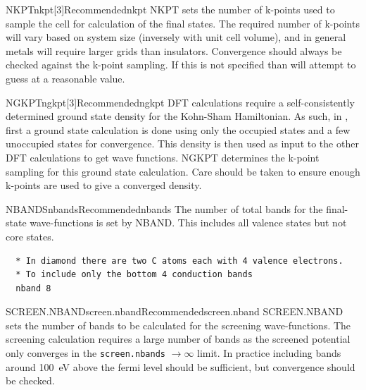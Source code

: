 \documentclass[11pt]{report}
\begin{document}
\begin{Card}{NKPT}{nkpt[3]}{Recommended}{nkpt}
NKPT sets the number of k-points used to sample the cell for calculation of the final states. The required number of k-points will vary based on system size (inversely with unit cell volume), and in general metals will require larger grids than insulators. Convergence should always be checked against the k-point sampling. If this is not specified than  will attempt to guess at a reasonable value. 
\end{Card}

\begin{Card}{NGKPT}{ngkpt[3]}{Recommended}{ngkpt}
DFT calculations require a self-consistently determined ground state density for the Kohn-Sham Hamiltonian. As such, in , first a ground state calculation is done using only the occupied states and a few unoccupied states for convergence. This density is then used as input to the other DFT calculations to get wave functions. NGKPT determines the k-point sampling for this ground state calculation. Care should be taken to ensure enough k-points are used to give a converged density.
\end{Card}

\begin{Card}{NBANDS}{nbands}{Recommended}{nbands}
The number of total bands for the final-state wave-functions is set by NBAND. This includes all valence states but not core states.
\begin{verbatim}
  * In diamond there are two C atoms each with 4 valence electrons.
  * To include only the bottom 4 conduction bands
  nband 8
\end{verbatim}
\end{Card}

\begin{Card}{SCREEN.NBAND}{screen.nband}{Recommended}{screen.nband}
SCREEN.NBAND sets the number of bands to be calculated for the screening wave-functions. The screening calculation requires a large number of bands as the screened potential only converges in the \texttt{screen.nbands} $\rightarrow \infty$ limit. In practice including bands around 100~eV above the fermi level should be sufficient, but convergence should be checked. 
\end{Card}
\end{document}

